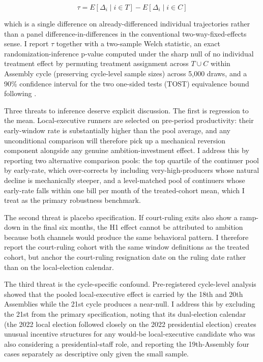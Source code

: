 \documentclass[11pt]{article}
\begin{document}
\begin{equation}
\tau = E[\Delta_i \mid i \in T] - E[\Delta_i \mid i \in C]
\label{eq:did}
\end{equation}

which is a single difference on already-differenced individual trajectories rather than a panel difference-in-differences in the conventional two-way-fixed-effects sense. I report $\tau$ together with a two-sample Welch statistic, an exact randomization-inference p-value computed under the sharp null of no individual treatment effect by permuting treatment assignment across $T \cup C$ within Assembly cycle (preserving cycle-level sample sizes) across 5{,}000 draws, and a 90\% confidence interval for the two one-sided tests (TOST) equivalence bound following \citet{titiunik2017}.

Three threats to inference deserve explicit discussion. The first is regression to the mean. Local-executive runners are selected on pre-period productivity: their early-window rate is substantially higher than the pool average, and any unconditional comparison will therefore pick up a mechanical reversion component alongside any genuine ambition-investment effect. I address this by reporting two alternative comparison pools: the top quartile of the continuer pool by early-rate, which over-corrects by including very-high-producers whose natural decline is mechanically steeper, and a level-matched pool of continuers whose early-rate falls within one bill per month of the treated-cohort mean, which I treat as the primary robustness benchmark.

The second threat is placebo specification. If court-ruling exits also show a ramp-down in the final six months, the H1 effect cannot be attributed to ambition because both channels would produce the same behavioral pattern. I therefore report the court-ruling cohort with the same window definitions as the treated cohort, but anchor the court-ruling resignation date on the ruling date rather than on the local-election calendar.

The third threat is the cycle-specific confound. Pre-registered cycle-level analysis showed that the pooled local-executive effect is carried by the 18th and 20th Assemblies while the 21st cycle produces a near-null. I address this by excluding the 21st from the primary specification, noting that its dual-election calendar (the 2022 local election followed closely on the 2022 presidential election) creates unusual incentive structures for any would-be local-executive candidate who was also considering a presidential-staff role, and reporting the 19th-Assembly four cases separately as descriptive only given the small sample.
\end{document}

